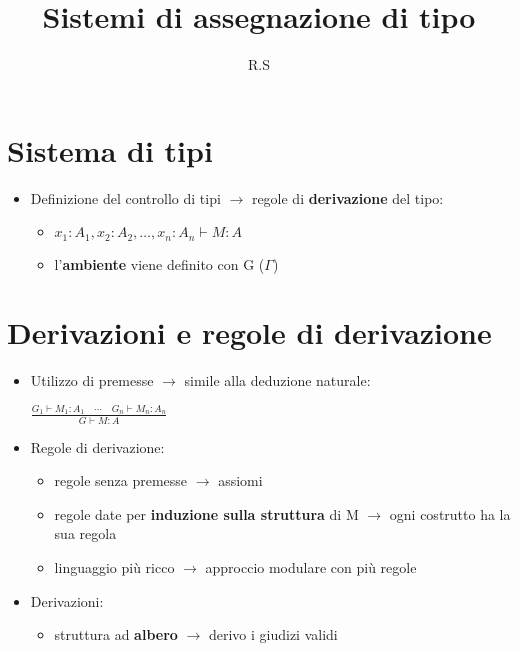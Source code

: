 \documentclass[12pt]{extarticle}
\title{Sistemi di assegnazione di tipo}
\author{R.S}
\begin{document}
\maketitle

\section*{Sistema di tipi}
\begin{itemize}
  \item Definizione del controllo di tipi $\rightarrow$ regole di \textbf{derivazione} del tipo:
  \begin{itemize}
    \item $x_1:A_1, x_2:A_2, \dots, x_n:A_n \vdash M:A$
    \item l'\textbf{ambiente} viene definito con G ($\Gamma$)
  \end{itemize}
\end{itemize}

\section*{Derivazioni e regole di derivazione}
\begin{itemize}
  \item Utilizzo di premesse $\rightarrow$ simile alla deduzione naturale: 
  \begin{flushleft}
    \(
        \displaystyle
        \frac{G_1 \vdash M_1 : A_1 \quad \cdots \quad G_n \vdash M_n : A_n}
        {G \vdash M : A}\)
  \end{flushleft}
  \item Regole di derivazione:
  \begin{itemize}
    \item regole senza premesse $\rightarrow$ assiomi
    \item regole date per \textbf{induzione sulla struttura} di M $\rightarrow$ ogni costrutto ha la sua regola
    \item linguaggio più ricco $\rightarrow$ approccio modulare con più regole
  \end{itemize}
  \item Derivazioni:
  \begin{itemize}
    \item struttura ad \textbf{albero} $\rightarrow$ derivo i giudizi validi
  \end{itemize}
\end{itemize}
\end{document}
